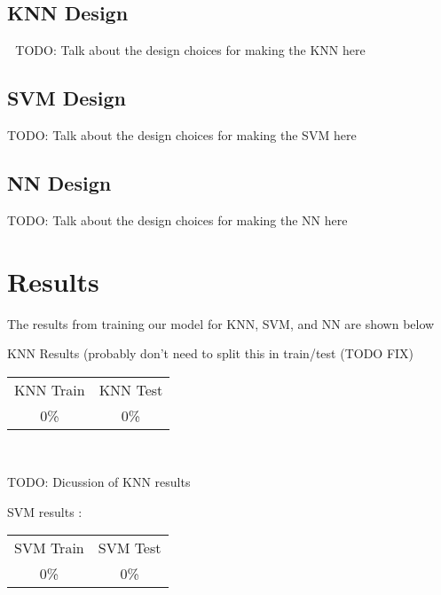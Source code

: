 \documentclass[letterpaper, 12 pt, conference]{ieeeconf}  %
\begin{document}
\subsection{KNN Design}

\newline \,\,
\nelwine TODO: Talk about the design choices for making the KNN here
\newline \,\,

\subsection{SVM Design}

TODO: Talk about the design choices for making the SVM here
\newline \,\,

\subsection{NN Design}

TODO: Talk about the design choices for making the NN here
\newline \,\,


\section{Results}

The results from training our model for KNN, SVM, and NN are shown below
\newline \,\,

\par KNN Results (probably don't need to split this in train/test (TODO FIX)

\begin{center}
    \begin{tabular}{ |c|c| }
 KNN Train & KNN Test  \\ 
 0\% & 0\% \\

\end{tabular}\\

\end{center}

\par TODO: Dicussion of KNN results
\newline \,\,


\par SVM results :
\begin{center}
    \begin{tabular}{ |c|c| }
 SVM Train & SVM Test \\ 
 0\% & 0\% \\

\end{tabular}\\
\end{center}
\end{document}
